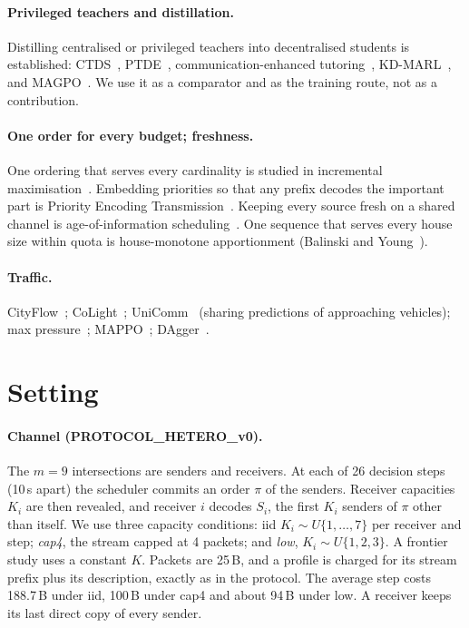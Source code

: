 \documentclass[11pt]{article}
\theoremstyle{definition}
\begin{document}
\paragraph{Privileged teachers and distillation.} Distilling centralised or privileged teachers into decentralised
students is established: CTDS~\cite{ctds}, PTDE~\cite{ptde}, communication-enhanced tutoring~\cite{tutoring},
KD-MARL~\cite{kdmarl}, and MAGPO~\cite{magpo}. We use it as a comparator and as the training route, not as a
contribution.
\paragraph{One order for every budget; freshness.} One ordering that serves every cardinality is studied in incremental
maximisation~\cite{bernstein2022,bienkowski2026}. Embedding priorities so that any prefix decodes the important part is
Priority Encoding Transmission~\cite{pet}. Keeping every source fresh on a shared channel is age-of-information
scheduling~\cite{kadota2018}. One sequence that serves every house size within quota is house-monotone apportionment
(Balinski and Young~\cite{balinski1982}).
\paragraph{Traffic.} CityFlow~\cite{cityflow}; CoLight~\cite{colight}; UniComm~\cite{unicomm} (sharing predictions of
approaching vehicles); max pressure~\cite{varaiya2013}; MAPPO~\cite{mappo}; DAgger~\cite{dagger}.

\section{Setting}\label{sec:setting}
\paragraph{Channel (PROTOCOL\_HETERO\_v0).} The $m=9$ intersections are senders and receivers. At each of 26 decision
steps (10\,s apart) the scheduler commits an order $\pi$ of the senders. Receiver capacities $K_i$ are then revealed,
and receiver $i$ decodes $S_i$, the first $K_i$ senders of $\pi$ other than itself. We use three capacity conditions: iid
$K_i\sim U\{1,\dots,7\}$ per receiver and step; \emph{cap4}, the stream capped at 4 packets; and \emph{low},
$K_i\sim U\{1,2,3\}$. A frontier study uses a constant $K$. Packets are 25\,B, and a profile is charged for its stream
prefix plus its description, exactly as in the protocol. The average step costs 188.7\,B under iid, 100\,B under cap4
and about 94\,B under low. A receiver keeps its last direct copy of every sender.
\end{document}

